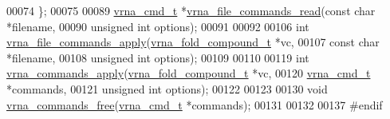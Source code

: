 \begin{DoxyCode}
00074 \};
00075 
00089 \mbox{\hyperlink{group__file__utils_structvrna__command__s}{vrna\_cmd\_t}} *\mbox{\hyperlink{group__file__utils_ga5d2a64331cff5b1059e7d327545d8a63}{vrna\_file\_commands\_read}}(\textcolor{keyword}{const} \textcolor{keywordtype}{char}    *filename,
00090                                     \textcolor{keywordtype}{unsigned} \textcolor{keywordtype}{int}  options);
00091 
00092 
00106 \textcolor{keywordtype}{int} \mbox{\hyperlink{group__file__utils_gadbe8c9622f7bcc6dcbe3448b98df8656}{vrna\_file\_commands\_apply}}(\mbox{\hyperlink{group__fold__compound_structvrna__fc__s}{vrna\_fold\_compound\_t}} *vc,
00107                              \textcolor{keyword}{const} \textcolor{keywordtype}{char}           *filename,
00108                              \textcolor{keywordtype}{unsigned} \textcolor{keywordtype}{int}         options);
00109 
00110 
00119 \textcolor{keywordtype}{int} \mbox{\hyperlink{group__file__utils_ga5e993fc4b9602af73aaaab4d3b3cd9a9}{vrna\_commands\_apply}}(\mbox{\hyperlink{group__fold__compound_structvrna__fc__s}{vrna\_fold\_compound\_t}}  *vc,
00120                         \mbox{\hyperlink{group__file__utils_structvrna__command__s}{vrna\_cmd\_t}}            *commands,
00121                         \textcolor{keywordtype}{unsigned} \textcolor{keywordtype}{int}          options);
00122 
00123 
00130 \textcolor{keywordtype}{void} \mbox{\hyperlink{group__file__utils_ga926fd7632e68f3da2e2069402b80b1ab}{vrna\_commands\_free}}(\mbox{\hyperlink{group__file__utils_structvrna__command__s}{vrna\_cmd\_t}} *commands);
00131 
00132 
00137 \textcolor{preprocessor}{#endif}
\end{DoxyCode}
